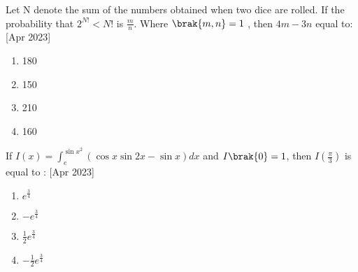    \item Let N denote the sum of the numbers obtained when two dice are rolled. If the probability that $2^{N!} < N!$ is $\frac{m}{n}$. Where $\brak{m,n}=1$ , then $4m-3n$ equal to:
     \hfill{[Apr 2023]}
    \begin{multicols}{4}
            \begin{enumerate}
              \item 180
              \item 150
              \item 210
              \item 160
            \end{enumerate}
        \end{multicols}
        \item If $I(x)=\int_ e^{\sin{x}^2} (\cos{x}\sin{2x}-\sin{x}) dx$ and $I\brak{0}=1$, then $I(\frac{\pi}{3})$ is equal to :
         \hfill{[Apr 2023]}
        \begin{multicols}{4}
            \begin{enumerate}
              \item $e^{\frac{3}{4}}$
              \item $-e^{\frac{3}{4}}$
            \item $\frac{1}{2}e^{\frac{3}{4}}$
              \item $-\frac{1}{2}e^{\frac{3}{4}}$
            \end{enumerate}
        \end{multicols}


